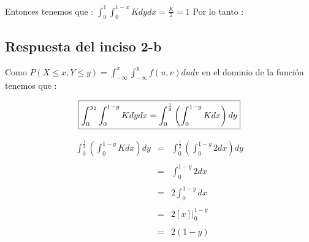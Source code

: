 \documentclass[12pt]{article}
\begin{document}
    \begin{flushleft}
        Entonces tenemos que : $\displaystyle \int_{0}^{1} \int_{0}^{1-x}K dy dx = \frac{K}{2} = 1$ 
        Por lo tanto : 
    \end{flushleft}
     
     
    \subsection*{Respuesta del inciso 2-b}

    \begin{flushleft}
        Como $P\left(X\leq x,Y\leq y\right) = \int_{-\infty}^{x}\int_{-\infty}^{y}f\left(u,v\right)du dv$ en el dominio de la funci\'on tenemos que :
    \end{flushleft}
     
      
    \begin{equation*}
        \fbox{$ 
            \displaystyle \int_{0}^{y_2}\int_{0}^{1-y}K dy dx = \displaystyle \int_{0}^{\frac{1}{2}}\left(\int_{0}^{1-y}Kdx\right) dy 
        $}
    \end{equation*}

    \begin{equation*}
        \begin{array}{rcl}
            \displaystyle \int_{0}^{\frac{1}{2}} \left(\int_{0}^{1-y} K dx \right) dy & = &\displaystyle \int_{0}^{\frac{1}{2}}\left(\int_{0}^{1-y}2dx\right)dy
            \\
            \\
            & = & \displaystyle\int_{0}^{1-y}2 dx 
            \\
            \\
            & = & \displaystyle 2\int_{0}^{1-y}dx
            \\
            \\
            & = & \displaystyle2\left[x\right]\vert_{0}^{1-y}
            \\
            \\
            & = & \displaystyle 2\left(1-y\right)
        \end{array}
    \end{equation*}
\end{document}
